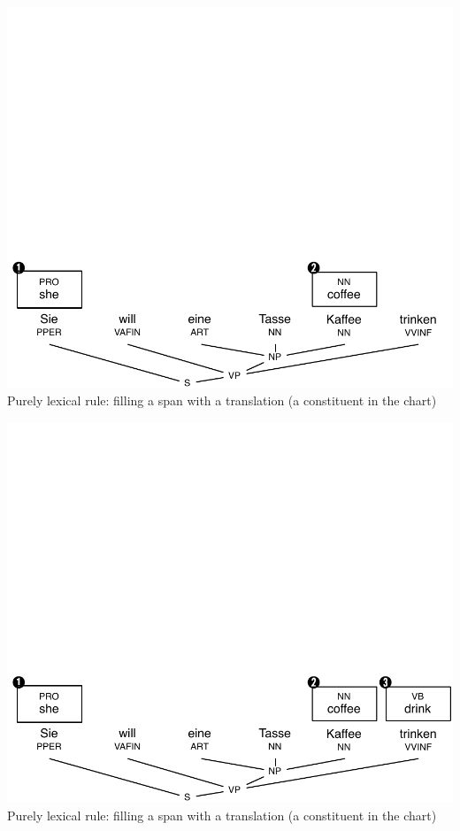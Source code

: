 \documentclass[landscape]{slides}
\begin{document}

\vspace{-31mm}
\begin{center}
\includegraphics[scale=1.15]{chart-parsing2.pdf}\\
Purely lexical rule: filling a span with a translation (a constituent in the chart)
\end{center}


\vspace{-31mm}
\begin{center}
\includegraphics[scale=1.15]{chart-parsing3.pdf}\\
Purely lexical rule: filling a span with a translation (a constituent in the chart)
\end{center}
\end{document}
